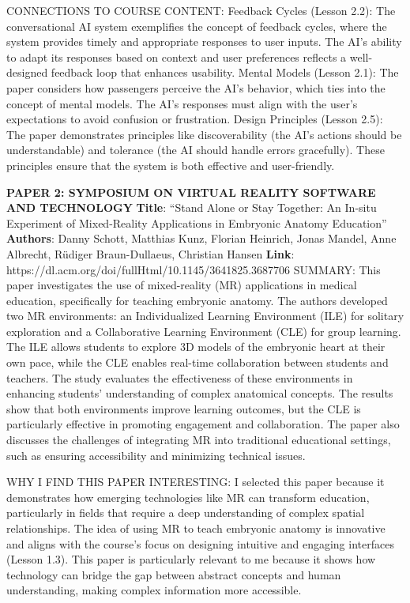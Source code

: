 \documentclass[
	letterpaper, %
]{jdf}
\begin{document}
CONNECTIONS TO COURSE CONTENT:
Feedback Cycles (Lesson 2.2): The conversational AI system exemplifies the concept of feedback cycles, where the system provides timely and appropriate responses to user inputs. The AI’s ability to adapt its responses based on context and user preferences reflects a well-designed feedback loop that enhances usability.
Mental Models (Lesson 2.1): The paper considers how passengers perceive the AI’s behavior, which ties into the concept of mental models. The AI’s responses must align with the user’s expectations to avoid confusion or frustration.
Design Principles (Lesson 2.5): The paper demonstrates principles like discoverability (the AI’s actions should be understandable) and tolerance (the AI should handle errors gracefully). These principles ensure that the system is both effective and user-friendly.

\textbf{PAPER 2: SYMPOSIUM ON VIRTUAL REALITY SOFTWARE AND TECHNOLOGY}
\newline \textbf{Title}: “Stand Alone or Stay Together: An In-situ Experiment of Mixed-Reality Applications in Embryonic Anatomy Education”
\newline \textbf{Authors}: Danny Schott, Matthias Kunz, Florian Heinrich, Jonas Mandel, Anne Albrecht, Rüdiger Braun-Dullaeus, Christian Hansen
\newline \textbf{Link}: https://dl.acm.org/doi/fullHtml/10.1145/3641825.3687706
\newline SUMMARY:
This paper investigates the use of mixed-reality (MR) applications in medical education, specifically for teaching embryonic anatomy. The authors developed two MR environments: an Individualized Learning Environment (ILE) for solitary exploration and a Collaborative Learning Environment (CLE) for group learning. The ILE allows students to explore 3D models of the embryonic heart at their own pace, while the CLE enables real-time collaboration between students and teachers. The study evaluates the effectiveness of these environments in enhancing students’ understanding of complex anatomical concepts. The results show that both environments improve learning outcomes, but the CLE is particularly effective in promoting engagement and collaboration. The paper also discusses the challenges of integrating MR into traditional educational settings, such as ensuring accessibility and minimizing technical issues.

WHY I FIND THIS PAPER INTERESTING:
I selected this paper because it demonstrates how emerging technologies like MR can transform education, particularly in fields that require a deep understanding of complex spatial relationships. The idea of using MR to teach embryonic anatomy is innovative and aligns with the course’s focus on designing intuitive and engaging interfaces (Lesson 1.3). This paper is particularly relevant to me because it shows how technology can bridge the gap between abstract concepts and human understanding, making complex information more accessible.
\end{document}

